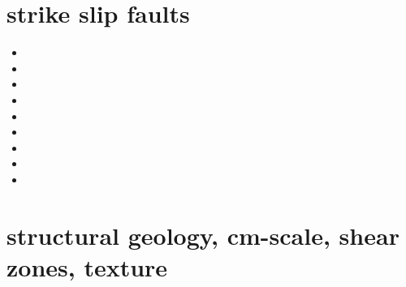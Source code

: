 \section{strike slip faults} 

\begin{small}
\begin{itemize}
\item[\nineteenseventyfour]
\item[\nineteeneightyeight]
\item[\nineteenninetytwo]
\item[\twothousandeleven]
\item[\twothousandfourteen]
\item[\twothousandseventeen]
\item[\twothousandtwenty]
\item[\twothousandtwentytwo]
\item[\twothousandtwentyfour]
\end{itemize}
\end{small}





\section{structural geology, cm-scale, shear zones, texture}

